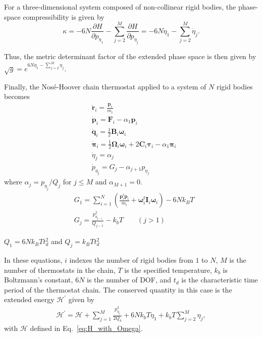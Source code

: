 \documentclass[aip,jcp,reprint,amsmath,amssymb,amsfont]{revtex4-1}
\newcommand{\mt}[1]{\boldsymbol{\mathbf{#1}}}           %
\newcommand{\vt}[1]{\boldsymbol{\mathbf{#1}}}           %
\newcommand{\tr}[1]{#1^t}                               %
\newcommand{\diff}[2]{\dfrac{\partial #1}{\partial #2}} %
\begin{document}
For a three-dimensional system composed of non-collinear rigid bodies, the phase-space compressibility is given by\cite{Tuckerman2010}
\[
\kappa = -6N \diff{H}{p_{\eta_1}} - \sum_{j=2}^M \diff{H}{p_{\eta_j}} = -6N \dot{\eta}_1 - \sum_{j=2}^M \dot{\eta}_j.
\]

Thus, the metric determinant factor of the extended phase space is then given by $\sqrt{g} = e^{6N \eta_1 - \sum_{j=2}^M \eta_j}$.\cite{Tuckerman_1999, Tuckerman2001}


Finally, the Nos\'{e}-Hoover chain thermostat applied to a system of $N$ rigid bodies becomes
\begin{subequations}
\label{eq:nhc_system}
\begin{align}
&\dot{\vt r}_i = \frac{{\vt p}_i}{m_i} \\ 
&\dot{\vt p}_i = {\vt F}_i - \alpha_1 \vt p_i \\
&\dot{\vt q}_i = \frac{1}{2} \mt B_i \vt \omega_i \\
&\dot{\vt \pi}_i = \frac{1}{2} \mt \Omega_i \vt \omega_i + 2 \mt C_i \vt \tau_i - \alpha_1 \vt \pi_i \\
&\dot{\eta}_j = \alpha_j \\
&{\dot p}_{\eta_j} = G_j - \alpha_{j+1} p_{\eta_j}
\end{align}
\end{subequations}
where $\alpha_j = {p_{\eta_j}}/{Q_j}$ for $j \leq M$ and $\alpha_{M+1} = 0$.
\begin{align*}
&G_1 = \sum_{i=1}^N \left( \frac{\tr{\vt p}_i{\vt p}_i}{m_i} + \tr{\vt \omega}_i \mt I_i \vt \omega_i \right) - 6N k_B T \\
&G_j = \frac{p_{\eta_{j-1}}^2}{Q_{j-1}} - k_b T \qquad (j > 1)
\end{align*}

$Q_1 = 6 N k_B T t_d^2$ and $Q_j = k_B T t_d^2$

In these equations, $i$ indexes the number of rigid bodies from $1$ to $N$, $M$ is the number of thermostats in the chain, $T$ is the specified temperature, $k_b$ is Boltzmann's constant, $6N$ is the number of DOF, and $t_d$ is the characteristic time period of the thermostat chain. The conserved quantity in this case is the extended energy $\mathcal{H}^\prime$ given by
\begin{align*}
\mathcal{H}^\prime = \mathcal{H} + \sum_{j=1}^{M}\frac{p_{\eta_j}^2}{2Q_k} + 6Nk_bT\eta_1 + k_bT\sum_{j=2}^M \eta_j,
\end{align*}
with $\mathcal{H}$ defined in Eq.~\ref{eq:H_with_Omega}. 
\end{document}
